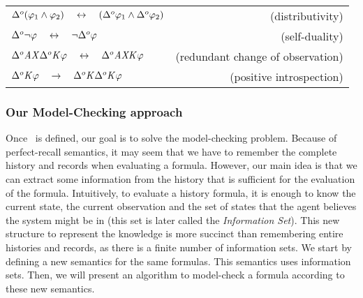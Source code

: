 \begin{tabular}{l r}
$\Delta^{o}(\varphi_1\wedge\varphi_2)\quad\leftrightarrow\quad(\Delta^{o}\varphi_1\wedge\Delta^{o}\varphi_2)$ & (distributivity)\\
$\Delta^{o}\neg\varphi\quad\leftrightarrow\quad\neg\Delta^{o}\varphi$ & (self-duality)\\
$\Delta^{o}\mathit{A}\mathit{X}\Delta^{o}\mathit{K}\varphi\quad\leftrightarrow\quad\Delta^{o}\mathit{A}\mathit{X}\mathit{K}\varphi$ & (redundant change of observation)\\
$\Delta^{o}\mathit{K}\varphi\quad\rightarrow\quad\Delta^{o}\mathit{K}\Delta^{o}\mathit{K}\varphi$ & (positive introspection)
\end{tabular}

\subsubsection{Our Model-Checking approach}
Once \ctlskd\ is defined, our goal is to solve the model-checking problem. Because of perfect-recall semantics, it may seem that we have to remember the complete history and records when evaluating a formula. However, our main idea is that we can extract some information from the history that is sufficient for the evaluation of the formula. Intuitively, to evaluate a history formula, it is enough to know the current state, the current observation and the set of states that the agent believes the system might be in (this set is later called the \textit{Information Set}). This new structure to represent the knowledge is more succinct than remembering entire histories and records, as there is a finite number of information sets.
We start by defining a new semantics for the same formulas. This semantics uses information sets. Then, we will present an algorithm to model-check a formula according to these new semantics.
